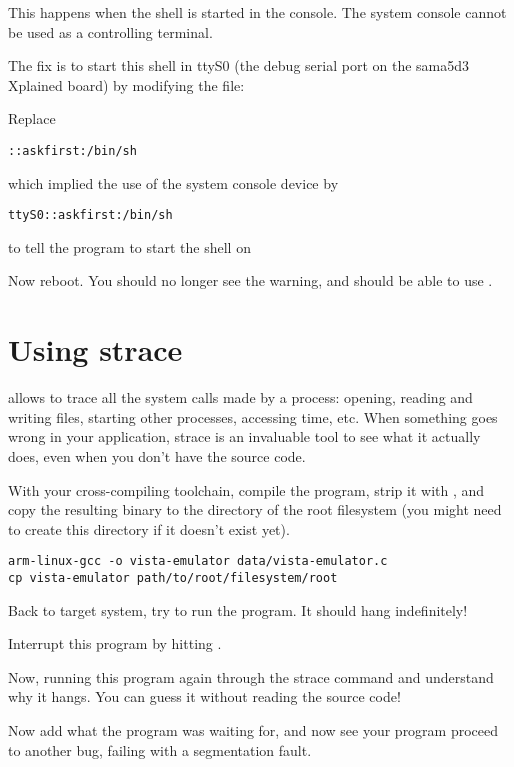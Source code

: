 This happens when the shell is started in the console. The system
console cannot be used as a controlling terminal.

The fix is to start this shell in ttyS0 (the debug serial port on
the sama5d3 Xplained board) by modifying the  file:

Replace
\begin{verbatim}
::askfirst:/bin/sh
\end{verbatim}
which implied the use of the system console device by
\begin{verbatim}
ttyS0::askfirst:/bin/sh
\end{verbatim}
to tell the  program to start the shell on 

Now reboot. You should no longer see the 
warning, and should be able to use \code{[Ctrl] [C]}.

\section{Using strace}

 allows to trace all the system calls made by a process:
opening, reading and writing files, starting other processes,
accessing time, etc. When something goes wrong in your application,
strace is an invaluable tool to see what it actually does, even when
you don't have the source code.

With your cross-compiling toolchain, compile the
 program, strip it with ,
and copy the resulting binary to
the  directory of the root filesystem (you might need to create
this directory if it doesn't exist yet).

\begin{verbatim}
arm-linux-gcc -o vista-emulator data/vista-emulator.c
cp vista-emulator path/to/root/filesystem/root
\end{verbatim}

Back to target system, try to run the 
program. It should hang indefinitely!

Interrupt this program by hitting \code{[Ctrl] [C]}.

Now, running this program again through the strace command and
understand why it hangs. You can guess it without reading the source
code!

Now add what the program was waiting for, and now see your program
proceed to another bug, failing with a segmentation fault.

